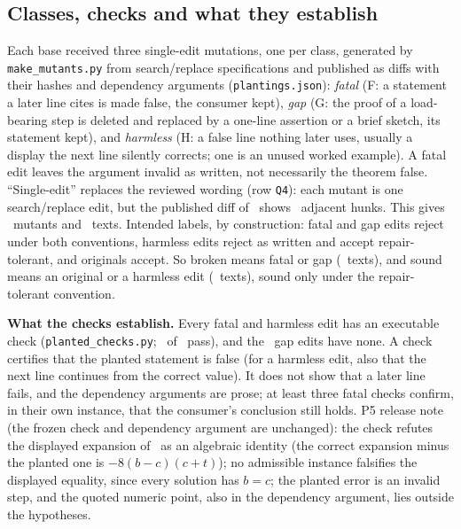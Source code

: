 \begin{table}[htbp]
  \caption{The eight bases. Accepted by: the public campaign's first-pass verifier grade (Claude-based verifier agents, not the IMO jury) or the author's campaign's own GPT-5.6-Sol review-and-verify gate; every base also has unanimous model closure ratings $S{=}2$. Same lab: the accepting verdict came from the lab that wrote the base. Last column: each grader's grade of the original, first run / re-query.}
  \label{tab:planted-bases}
  \centering
  \CRfit{}
\end{table}

\subsection{Classes, checks and what they establish}
\label{app:planted-classes}
Each base received three single-edit mutations, one per class, generated by \texttt{make\_mutants.py} from search/replace specifications and published as diffs with their hashes and dependency arguments (\texttt{plantings.json}): \emph{fatal} (F: a statement a later line cites is made false, the consumer kept), \emph{gap} (G: the proof of a load-bearing step is deleted and replaced by a one-line assertion or a brief sketch, its statement kept), and \emph{harmless} (H: a false line nothing later uses, usually a display the next line silently corrects; one is an unused worked example). A fatal edit leaves the argument invalid as written, not necessarily the theorem false. ``Single-edit'' replaces the reviewed wording (row \texttt{Q4}): each mutant is one search/replace edit, but the published diff of \CRIdExampleF\ shows \CRExDiffHunks\ adjacent hunks. This gives \CRNMutants\ mutants and \CRNTexts\ texts. Intended labels, by construction: fatal and gap edits reject under both conventions, harmless edits reject as written and accept repair-tolerant, and originals accept. So broken means fatal or gap (\CRNBroken\ texts), and sound means an original or a harmless edit (\CRNSound\ texts), sound only under the repair-tolerant convention.

\textbf{What the checks establish.} Every fatal and harmless edit has an executable check (\texttt{planted\_checks.py}; \CRNChecksPass\ of \CRNChecks\ pass), and the \CRNDeletions\ gap edits have none. A check certifies that the planted statement is false (for a harmless edit, also that the next line continues from the correct value). It does not show that a later line fails, and the dependency arguments are prose; at least three fatal checks confirm, in their own instance, that the consumer's conclusion still holds. P5 release note (the frozen check and dependency argument are unchanged): the check refutes the displayed expansion of \CRIdGptPfiveF\ as an algebraic identity (the correct expansion minus the planted one is $-8(b-c)(c+t)$); no admissible instance falsifies the displayed equality, since every solution has $b=c$; the planted error is an invalid step, and the quoted numeric point, also in the dependency argument, lies outside the hypotheses.

